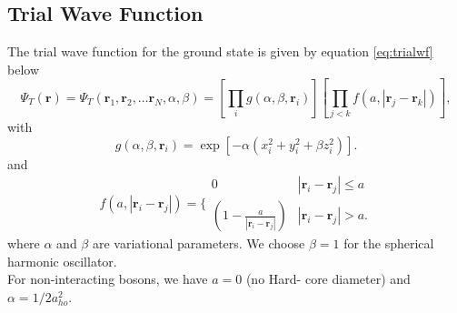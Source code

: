 \documentclass[11pt,a4paper,titlepage]{article}
\begin{document}
\subsection{Trial Wave Function}
The trial wave function for the ground state is given by equation \eqref{eq:trialwf} below
\begin{equation}
 \Psi_T(\mathbf{r})=\Psi_T(\mathbf{r}_1, \mathbf{r}_2, \dots \mathbf{r}_N,\alpha,\beta)
 =\left[
    \prod_i g(\alpha,\beta,\mathbf{r}_i)
 \right]
 \left[
    \prod_{j<k}f(a,|\mathbf{r}_j-\mathbf{r}_k|)
 \right],
 \label{eq:trialwf}
 \end{equation}
 with
 \begin{equation}
    g(\alpha,\beta,\mathbf{r}_i)= \exp{[-\alpha(x_i^2+y_i^2+\beta z_i^2)]}.
 \end{equation}
 and 
\begin{equation}
    f(a,|\mathbf{r}_i-\mathbf{r}_j|)=\Bigg\{
 \begin{array}{ll}
	 0 & {|\mathbf{r}_i-\mathbf{r}_j|} \leq {a}\\
	 (1-\frac{a}{|\mathbf{r}_i-\mathbf{r}_j|}) & {|\mathbf{r}_i-\mathbf{r}_j|} > {a}.
 \end{array}
 \end{equation}
 where $\alpha$ and $\beta$ are variational parameters. 
 We choose $\beta = 1$ for the spherical harmonic oscillator.\\For non-interacting
 bosons, we have $a=0$ (no Hard- core diameter) and $\alpha = 1/2a_{ho}^2$.

 
\end{document}
